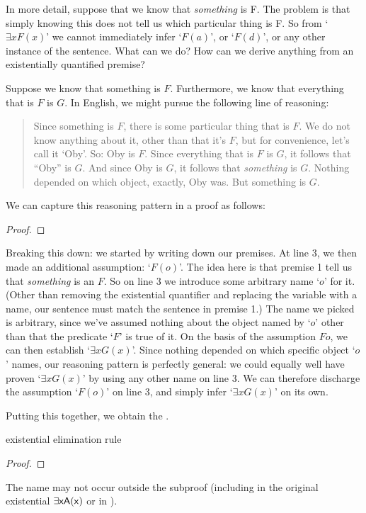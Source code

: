 In more detail, suppose that we know that \emph{something} is F. The problem is that simply knowing this does not tell us which particular thing is F. So from `$\exists x F(x)$' we cannot immediately infer `$F(a)$', or `$F(d)$', or any other instance of the sentence. What can we do?  How can we derive anything from an existentially quantified premise?

Suppose we know that something is $F$. Furthermore, we know that everything that is $F$ is $G$. In English, we might pursue the following line of reasoning:
	\begin{quote}
Since something is $F$, there is some particular thing that is $F$. We do not know anything about it, other than that it's $F$, but for convenience, let's call it `Oby'. So: Oby is $F$. Since everything that is $F$ is $G$, it follows that ``Oby'' is $G$. And since Oby is $G$, it follows that \emph{something} is $G$. Nothing depended on which object, exactly, Oby was. But something is $G$.
	\end{quote}
We can capture this reasoning pattern in a proof as follows:
\begin{proof}
	 \pr{}
	 \pr{}
	\open
		 \as{}
		 
	\close
\end{proof}\noindent
Breaking this down: we started by writing down our premises. At line 3, we then made an additional assumption: `$F(o)$'. The idea here is that premise 1 tell us that \emph{something} is an $F$.  So on line 3 we introduce some arbitrary name `$o$' for it. (Other than removing the existential quantifier and replacing the variable with a name, our sentence must match the sentence in premise 1.)
The name we picked is arbitrary, since we've assumed nothing about the object named by `$o$' other than that the predicate `$F$' is true of it.  On the basis of the assumption $Fo$, we can then establish `$\exists xG(x)$'.  Since nothing depended on which specific object `$o$' names, our reasoning pattern is perfectly general: we could equally well have proven `$\exists xG(x)$'  by using any other name on line 3. We can therefore discharge the assumption `$F(o)$' on line 3, and simply infer `$\exists x G(x)$' on its own.

Putting this together, we obtain the .

\begin{factboxy}{existential elimination rule}
\begin{proof}
	\open
		 \as{}
	\close
	 
\end{proof}

\small{The name  may not occur outside the subproof (including in the original existential $\exists \mathsf{x}\mathsf{A}(\mathsf{x})$ or in ).}
\end{factboxy}

